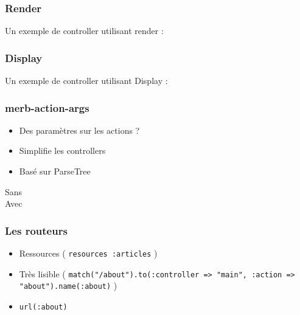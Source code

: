 \documentclass{beamer}
\begin{document}
\begin{frame}
    \frametitle{Render}

    Un exemple de controller utilisant render :

    \begin{center}
        
    \end{center}
\end{frame}

\begin{frame}
    \frametitle{Display}

    Un exemple de controller utilisant Display :

    \begin{center}
        
    \end{center}
\end{frame}

\begin{frame}
    \frametitle{merb-action-args}

    \begin{itemize}
        \item Des paramètres sur les actions ?
        \item Simplifie les controllers
        \item Basé sur ParseTree
    \end{itemize}
\end{frame}

\begin{frame}
    Sans
    \\
            

    Avec
    \\

            
\end{frame}

\begin{frame}
  \frametitle{Les routeurs}

  \begin{itemize}
    \item Ressources ( \texttt{resources :articles} )
    \item Très lisible ( 
      \texttt{match("/about").to(:controller => "main", :action => "about").name(:about)} )
    \item \texttt{url(:about)}
  \end{itemize}
\end{frame}
\end{document}

